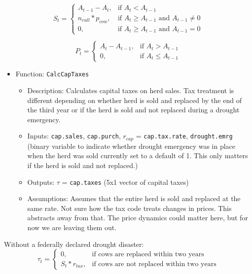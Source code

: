\documentclass[11pt]{article}
\begin{document}
\begin{equation}
S_t =
\begin{cases}
A_{t-1} - A_{t}, & \text{if  } A_t < A_{t-1} \\
n_{cull} * p_{cow}, & \text{if } A_t \geq A_{t-1} \text{ and } A_{t-1} \ne 0 \\
0, & \text{if } A_t \ge A_{t-1} \text{ and } A_{t-1} = 0
\end{cases} 
\end{equation}

\begin{equation}
P_t =
\begin{cases}
A_t - A_{t-1}, & \text{if } A_t > A_{t-1} \\
0, & \text{if } A_t \le A_{t-1}
\end{cases} 
\end{equation}

\begin{itemize}
\item Function: \verb!CalcCapTaxes!
	\begin{itemize}
	\item Description: Calculates capital taxes on herd sales. Tax treatment is different depending on whether herd is sold and replaced by the end of the third year or if the herd is sold and not replaced during a drought emergency.
	\item Inputs: \verb!cap.sales!, \verb!cap.purch!, $r_{cap}$ = \verb!cap.tax.rate!, \verb!drought.emrg! (binary variable to indicate whether drought emergency was in place when the herd was sold currently set to a default of 1. This only matters if the herd is sold and not replaced.)
	\item Outputs: $\tau$ = \verb!cap.taxes! (5x1 vector of capital taxes)
	\item Assumptions: Assumes that the entire herd is sold and replaced at the same rate. Not sure how the tax code treats changes in prices. This abstracts away from that. The price dynamics could matter here, but for now we are leaving them out.
	\end{itemize}
\end{itemize}

Without a federally declared drought disaster:
\begin{equation}
\tau_t = 
\begin{cases}
0, & \text{if cows are replaced within two years}  \\
S_t * r_{tax}, & \text{if cows are not replaced within two years}
\end{cases}
\end{equation}
\end{document}
